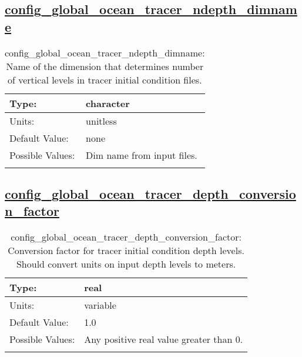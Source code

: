 \subsection[config\_global\_ocean\_tracer\_ndepth\_dimname]{\hyperref[sec:nm_tab_global_ocean]{config\_global\_ocean\_tracer\_ndepth\_dimname}}
\label{subsec:nm_sec_config_global_ocean_tracer_ndepth_dimname}
\begin{center}
\begin{longtable}{| p{2.0in} || p{4.0in} |}
    \hline
    Type: & character \\
    \hline
    Units: & \si{unitless} \\
    \hline
    Default Value: & none \\
    \hline
    Possible Values: & Dim name from input files. \\
    \hline
    \caption{config\_global\_ocean\_tracer\_ndepth\_dimname: Name of the dimension that determines number of vertical levels in tracer initial condition files.}
\end{longtable}
\end{center}
\subsection[config\_global\_ocean\_tracer\_depth\_conversion\_factor]{\hyperref[sec:nm_tab_global_ocean]{config\_global\_ocean\_tracer\_depth\_conversion\_factor}}
\label{subsec:nm_sec_config_global_ocean_tracer_depth_conversion_factor}
\begin{center}
\begin{longtable}{| p{2.0in} || p{4.0in} |}
    \hline
    Type: & real \\
    \hline
    Units: & \si{variable} \\
    \hline
    Default Value: & 1.0 \\
    \hline
    Possible Values: & Any positive real value greater than 0. \\
    \hline
    \caption{config\_global\_ocean\_tracer\_depth\_conversion\_factor: Conversion factor for tracer initial condition depth levels. Should convert units on input depth levels to meters.}
\end{longtable}
\end{center}
